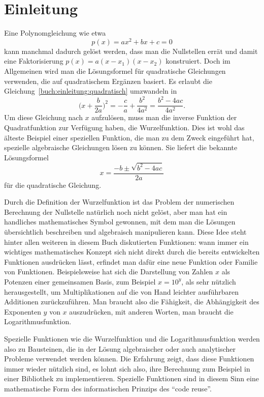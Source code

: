 %
%
%
\chapter*{Einleitung\label{chapter:einleitung}}
\rhead{}
Eine Polynomgleichung wie etwa
\begin{equation}
p(x) = ax^2+bx+c = 0
\label{buch:einleitung:quadratisch}
\end{equation}
kann manchmal dadurch gelöst werden, dass man die Nullstellen errät
und damit eine Faktorisierung $p(x)=a(x-x_1)(x-x_2)$ konstruiert.
Doch im Allgemeinen wird man die Lösungsformel für quadratische 
Gleichungen verwenden, die auf quadratischem Ergänzen basiert.
Es erlaubt die Gleichung~\eqref{buch:einleitung:quadratisch} umzwandeln in
\[
\biggl(x + \frac{b}{2a}\biggr)^2
=
-\frac{c}{a} + \frac{b^2}{4a^2}
=
\frac{b^2-4ac}{4a^2}.
\]
Um diese Gleichung nach $x$ aufzulösen, muss man die inverse Funktion
der Quadratfunktion zur Verfügung haben, die Wurzelfunktion.
Dies ist wohl das älteste Beispiel einer speziellen Funktion,
die man zu dem Zweck eingeführt hat, spezielle algebraische Gleichungen
lösen zu können.
Sie liefert die bekannte Lösungsformel
\[
x=\frac{-b\pm\sqrt{b^2-4ac}}{2a}
\]
für die quadratische Gleichung.

Durch die Definition der Wurzelfunktion ist das Problem der numerischen
Berechnung der Nullstelle natürlich noch nicht gelöst, aber man hat
ein handliches mathematisches Symbol gewonnen, mit dem man die Lösungen
übersichtlich beschreiben und algebraisch manipulieren kann.
Diese Idee steht hinter allen weiteren in diesem Buch diskutierten
Funktionen: wann immer ein wichtiges mathematisches Konzept sich nicht
direkt durch die bereits entwickelten Funktionen ausdrücken lässt,
erfindet man dafür eine neue Funktion oder Familie von Funktionen.
Beispielsweise hat sich die Darstellung von Zahlen $x$ als Potenzen
einer gemeinsamen Basis, zum Beispiel $x=10^y$, als sehr nützlich
herausgestellt, um Multiplikationen auf die von Hand leichter
ausführbaren Additionen zurückzuführen.
Man braucht also die Fähigkeit, die Abhängigkeit des Exponenten $y$
von $x$ auszudrücken, mit anderen Worten, man braucht die Logarithmusfunktion.

Spezielle Funktionen wie die Wurzelfunktion und die Logarithmusfunktion
werden also zu Bausteinen, die in der Lösung algebraischer oder auch
analytischer Probleme verwendet werden können.
Die Erfahrung zeigt, dass diese Funktionen immer wieder nützlich
sind, es lohnt sich also, ihre Berechnung zum Beispiel in einer
Bibliothek zu implementieren.
Spezielle Funktionen sind in diesem Sinn eine mathematische Form
des informatischen Prinzips des ``code reuse''.

